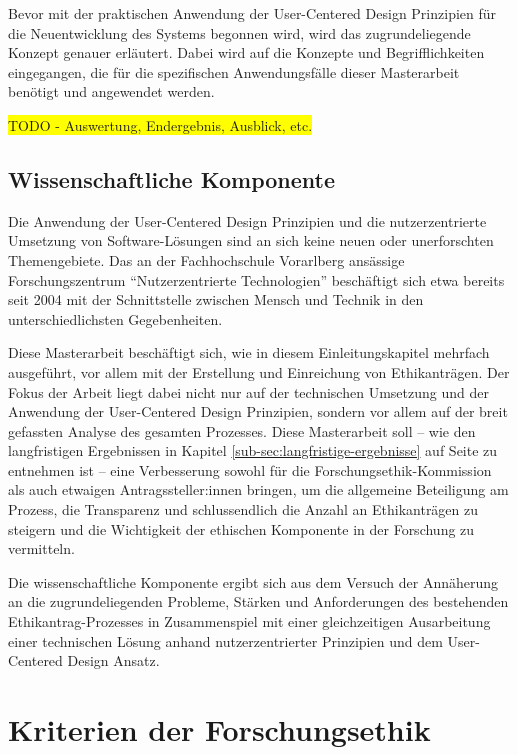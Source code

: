 \documentclass[a4paper,12pt,twoside]{scrreprt}
\begin{document}
Bevor mit der praktischen Anwendung der User-Centered Design Prinzipien für die Neuentwicklung des Systems begonnen wird, wird das zugrundeliegende Konzept genauer erläutert. Dabei wird auf die Konzepte und Begrifflichkeiten eingegangen, die für die spezifischen Anwendungsfälle dieser Masterarbeit benötigt und angewendet werden.

\colorbox{yellow}{TODO - Auswertung, Endergebnis, Ausblick, etc.}

\section{Wissenschaftliche Komponente}
\label{sec:wissenschaftliche-komponente}

Die Anwendung der User-Centered Design Prinzipien und die nutzerzentrierte Umsetzung von Software-Lösungen sind an sich keine neuen oder unerforschten Themengebiete. Das an der Fachhochschule Vorarlberg ansässige Forschungszentrum \enquote{Nutzerzentrierte Technologien} beschäftigt sich etwa bereits seit 2004 mit der Schnittstelle zwischen Mensch und Technik in den unterschiedlichsten Gegebenheiten. \cite{fachhochschule_vorarlberg_gmbh_nutzerzentrierte_2021}

Diese Masterarbeit beschäftigt sich, wie in diesem Einleitungskapitel mehrfach ausgeführt, vor allem mit der Erstellung und Einreichung von Ethikanträgen. Der Fokus der Arbeit liegt dabei nicht nur auf der technischen Umsetzung und der Anwendung der User-Centered Design Prinzipien, sondern vor allem auf der breit gefassten Analyse des gesamten Prozesses. Diese Masterarbeit soll -- wie den langfristigen Ergebnissen in Kapitel \ref{sub-sec:langfristige-ergebnisse} auf Seite \pageref{sub-sec:langfristige-ergebnisse} zu entnehmen ist -- eine Verbesserung sowohl für die Forschungsethik-Kommission als auch etwaigen Antragssteller:innen bringen, um die allgemeine Beteiligung am Prozess, die Transparenz und schlussendlich die Anzahl an Ethikanträgen zu steigern und die Wichtigkeit der ethischen Komponente in der Forschung zu vermitteln.

Die wissenschaftliche Komponente ergibt sich aus dem Versuch der Annäherung an die zugrundeliegenden Probleme, Stärken und Anforderungen des bestehenden Ethikantrag-Prozesses in Zusammenspiel mit einer gleichzeitigen Ausarbeitung einer technischen Lösung anhand nutzerzentrierter Prinzipien und dem User-Centered Design Ansatz.

\chapter{Kriterien der Forschungsethik}
\label{chap:kriterien-forschungsethik}
\end{document}

